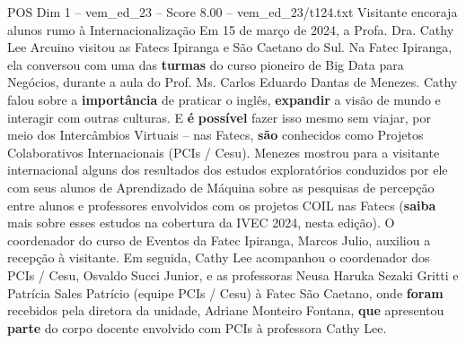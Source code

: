 \begin{textsample}{POS Dim 1 – vem\_ed\_23 – Score 8.00 – vem\_ed\_23/t124.txt}  \label{ex:f1_pos_141}
Visitante encoraja alunos rumo à Internacionalização Em 15 de março de 2024, a Profa.
Dra.
Cathy Lee Arcuino visitou as Fatecs Ipiranga e São Caetano do Sul.
Na Fatec Ipiranga, ela conversou com uma das \textbf{turmas} do curso pioneiro de Big Data para Negócios, durante a aula do Prof.
Ms.
Carlos Eduardo Dantas de Menezes.
Cathy falou sobre a \textbf{importância} de praticar o inglês, \textbf{expandir} a visão de mundo e interagir com outras culturas.
E \textbf{é} \textbf{possível} fazer isso mesmo sem viajar, por meio dos Intercâmbios Virtuais – nas Fatecs, \textbf{são} conhecidos como Projetos Colaborativos Internacionais (PCIs / Cesu).
Menezes mostrou para a visitante internacional alguns dos resultados dos estudos exploratórios conduzidos por ele com seus alunos de Aprendizado de Máquina sobre as pesquisas de percepção entre alunos e professores envolvidos com os projetos COIL nas Fatecs (\textbf{saiba} mais sobre esses estudos na cobertura da IVEC 2024, nesta edição).
O coordenador do curso de Eventos da Fatec Ipiranga, Marcos Julio, auxiliou a recepção à visitante.
Em seguida, Cathy Lee acompanhou o coordenador dos PCIs / Cesu, Osvaldo Succi Junior, e as professoras Neusa Haruka Sezaki Gritti e Patrícia Sales Patrício (equipe PCIs / Cesu) à Fatec São Caetano, onde \textbf{foram} recebidos pela diretora da unidade, Adriane Monteiro Fontana, \textbf{que} apresentou \textbf{parte} do corpo docente envolvido com PCIs à professora Cathy Lee.

\end{textsample}
